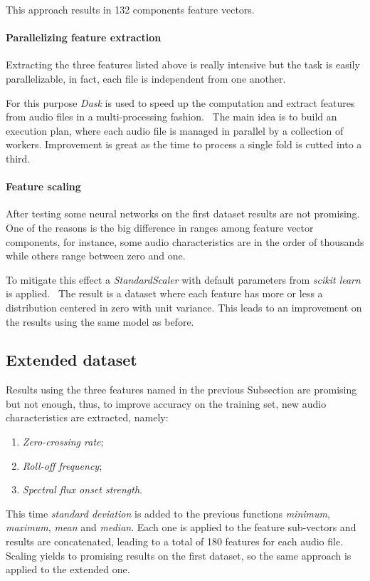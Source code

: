 This approach results in 132 components feature vectors.

\paragraph{Parallelizing feature extraction}
Extracting the three features listed above is really intensive 
but the task is easily parallelizable, in fact, each file is independent 
from one another.

For this purpose \emph{Dask} is used to speed up the computation and 
extract features from audio files in a multi-processing fashion.~\cite{dask}
The main idea is to build an execution plan, where each audio file 
is managed in parallel by a collection of workers. 
Improvement is great as the time to process a single fold 
is cutted into a third.

\paragraph{Feature scaling}
After testing some neural networks on the first dataset results 
are not promising. One of the reasons is the big difference in 
ranges among feature vector components, for instance, 
some audio characteristics are in the order of thousands while others 
range between zero and one.

To mitigate this effect a \emph{StandardScaler} with default parameters from \emph{scikit learn} is applied.~\cite{scaler}
The result is a dataset where each feature has more or less a distribution 
centered in zero with unit variance.
This leads to an improvement on the results using the same
model as before. 


\subsection{Extended dataset}
\label{extended-dataset}

Results using the three features named in the previous Subsection 
are promising but not enough, thus, to improve accuracy on the training set, 
new audio characteristics are extracted, namely:
\begin{enumerate}
    \item \emph{Zero-crossing rate};
    \item \emph{Roll-off frequency};
    \item \emph{Spectral flux onset strength}.
\end{enumerate}
This time \emph{standard deviation} is added to
the previous functions \emph{minimum}, \emph{maximum}, \emph{mean} 
and \emph{median}. Each one is applied to the feature sub-vectors and 
results are concatenated, leading to a total of 180 features for each audio file.
Scaling yields to promising results on the first dataset, 
so the same approach is applied to the extended one.

